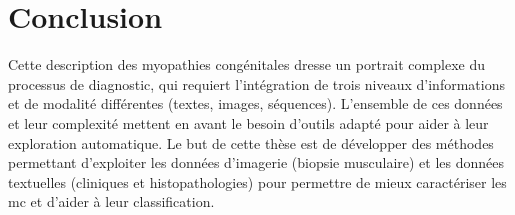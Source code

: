 \section{Conclusion}
Cette description des myopathies congénitales dresse un portrait complexe du processus de diagnostic, qui requiert l'intégration de trois niveaux d'informations et de modalité différentes (textes, images, séquences). L'ensemble de ces données et leur complexité mettent en avant le besoin d'outils adapté pour aider à leur exploration automatique. Le but de cette thèse est de développer des méthodes permettant d'exploiter les données d'imagerie (biopsie musculaire) et les données textuelles (cliniques et histopathologies) pour permettre de mieux caractériser les \gls{mc} et d'aider à leur classification. 